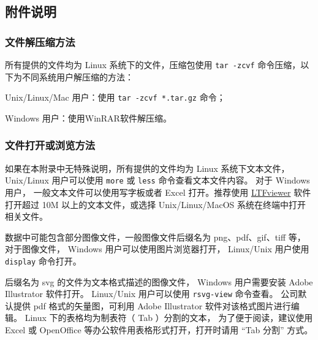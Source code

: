 \documentclass[
  a4paper,
  titlepage]{article}
\begin{document}
\hypertarget{ux9644ux4ef6ux8bf4ux660e}{%
\subsection{附件说明}\label{ux9644ux4ef6ux8bf4ux660e}}

\hypertarget{ux6587ux4ef6ux89e3ux538bux7f29ux65b9ux6cd5}{%
\subsubsection{文件解压缩方法}\label{ux6587ux4ef6ux89e3ux538bux7f29ux65b9ux6cd5}}

所有提供的文件均为 Linux 系统下的文件，压缩包使用 \texttt{tar\ -zcvf} 命令压缩，以下为不同系统用户解压缩的方法：

Unix/Linux/Mac 用户：使用 \texttt{tar\ -zcvf\ *.tar.gz} 命令；

Windows 用户：使用WinRAR软件解压缩。

\hypertarget{ux6587ux4ef6ux6253ux5f00ux6216ux6d4fux89c8ux65b9ux6cd5}{%
\subsubsection{文件打开或浏览方法}\label{ux6587ux4ef6ux6253ux5f00ux6216ux6d4fux89c8ux65b9ux6cd5}}

如果在本附录中无特殊说明，所有提供的文件均为 Linux 系统下文本文件， Unix/Linux 用户可以使用 \texttt{more} 或 \texttt{less} 命令查看文本文件内容。
对于 Windows 用户， 一般文本文件可以使用写字板或者 Excel 打开。推荐使用 \href{https://pan.baidu.com/s/1SN_YLyVSOhIJGsLgA27-Wg?pwd=0ek1}{LTFviewer} 软件打开超过 10M 以上的文本文件，或选择 Unix/Linux/MacOS 系统在终端中打开相关文件。

数据中可能包含部分图像文件，一般图像文件后缀名为 png、pdf、gif、tiff 等，对于图像文件， Windows 用户可以使用图片浏览器打开， Linux/Unix 用户使用 \texttt{display} 命令打开。

后缀名为 svg 的文件为文本格式描述的图像文件， Windows 用户需要安装 Adobe Illustrator 软件打开。 Linux/Unix 用户可以使用 \texttt{rsvg-view} 命令查看。
公司默认提供 pdf 格式的矢量图，可利用 Adobe Illustrator 软件对该格式图片进行编辑。 Linux 下的表格均为制表符（ Tab ）分割的文本，
为了便于阅读，建议使用 Excel 或 OpenOffice 等办公软件用表格形式打开，打开时请用 ``Tab 分割'' 方式。

\newpage

\newpage
\end{document}
